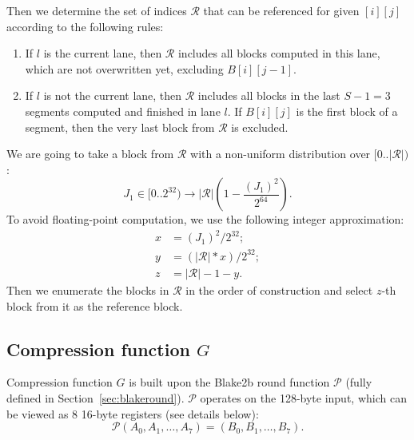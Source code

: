 \documentclass[a4paper]{article}
\begin{document}
 Then we determine the set of indices $\mathcal{R}$ that can be referenced for given $[i][j]$ according to the following rules:
\begin{enumerate}
    \item If $l$ is the current lane, then $\mathcal{R}$ includes all blocks computed in this lane, which are not overwritten yet, excluding $B[i][j-1]$.
    \item If $l$ is not the current lane, then $\mathcal{R}$ includes all blocks in the last $S-1=3$ segments computed and finished in lane $l$. If $B[i][j]$ is the first block of a segment, then the very last block from $\mathcal{R}$ is excluded.
\end{enumerate}
  We are going to take a block from $\mathcal{R}$ with a non-uniform distribution over $[0..|\mathcal{R}|)$:
  $$
  J_1\in [0..2^{32}) \rightarrow |\mathcal{R}|(1-\frac{(J_1)^2}{2^{64}}).
  $$ To avoid floating-point computation, we use the following integer approximation:
\begin{align*}
x &= (J_1)^2/2^{32};\\
y &= (|\mathcal{R}|*x)/2^{32};\\
z & = |\mathcal{R}|-1-y.
\end{align*}
Then we enumerate the blocks in $\mathcal{R}$ in the order of construction and select $z$-th block from it as the reference block.



\subsection{Compression function $G$}\label{sec:compr}

Compression function $G$ is built upon  the Blake2b round function $\mathcal{P}$ (fully defined in Section~\ref{sec:blakeround}). $\mathcal{P}$ operates on the 128-byte input, which can be viewed as 8 16-byte registers (see details below):
$$
\mathcal{P}(A_0,A_1,\ldots, A_7) = (B_0,B_1,\ldots, B_7).
$$
\end{document}
